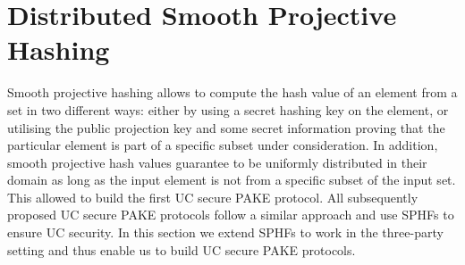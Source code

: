 \section{Distributed Smooth Projective Hashing} \label{sec:dsphf-2pake}

Smooth projective hashing allows to compute the hash value of an element from a set in two different ways:
either by using a secret hashing key on the element, or utilising the public projection key and some secret information proving that the particular element is part of a specific subset under consideration.
In addition, smooth projective hash values guarantee to be uniformly distributed in their domain as long as the input element is not from a specific subset of the input set.
This allowed \citet{Canetti2005} to build the first \ac{UC} secure \ac{PAKE} protocol.
All subsequently proposed \ac{UC} secure \ac{PAKE} protocols follow a similar approach and use \acp{SPHF} to ensure \ac{UC} security.
In this section we extend \acp{SPHF} to work in the three-party setting and thus enable us to build \ac{UC} secure \ac{PAKE} protocols.

%

